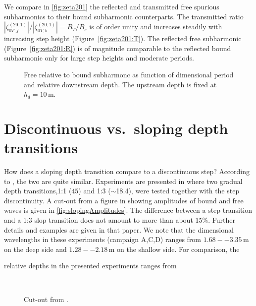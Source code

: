 \documentclass[internal]{sintefmemo}
\begin{document}
We compare in \autoref{fig:zeta201} the reflected and transmitted free spurious subharmonics to their bound subharmonic counterparts. 
The transmitted ratio $|\zeta_{0T,f}^{(20,1)}|/|\zeta_{0T,b}^{(20,1)}| = B_T/B_s$ is of order unity and increases steadily with increasing step height (Figure~\ref{fig:zeta201:T}).
The reflected free subharmonic (Figure~\ref{fig:zeta201:R}) is of magnitude comparable to the reflected bound subharmonic only for large step heights and moderate periods.

\begin{figure}[h!ptb]%
\centering
{}%
%
\caption{Free relative to bound subharmonc as function of dimensional period and relative downstream depth. The upstream depth is fixed at $h_d = 10$\,m.}%
\label{fig:zeta201}%
\end{figure}


\section{Discontinuous vs.\ sloping depth transitions}
How does a sloping depth transition compare to a discontinuous step?
According to \citet{li_2021_step2}, the two are quite similar.
Experiments are presented in \citet{li_2021_step2} where two gradual depth transitions,1:1 ($45$\textdegree) and 1:3 ($\sim$18.4\textdegree), were tested together with the step discontinuity. 
A cut-out from a figure in \citet{li_2021_step2} showing amplitudes of bound and free waves is given in \autoref{fig:slopingAmplitudes}. 
The difference between a step transition and a 1:3 slop transition does not amount to more than about 15\%.
Further details and examples are given in that paper.
We note that the dimensional wavelengths in these experiments (campaign A,C,D) ranges from $1.68--3.35$\,m on the deep side and $1.28--2.18$\,m on the shallow side. 
For comparison, the 

relative depths in the presented experiments ranges from 

\begin{figure}[H]%
\center
{}
\\%
\caption{Cut-out from \citet{li_2021_step2}.}%
\label{fig:slopingAmplitudes}%
\end{figure}
\end{document}
